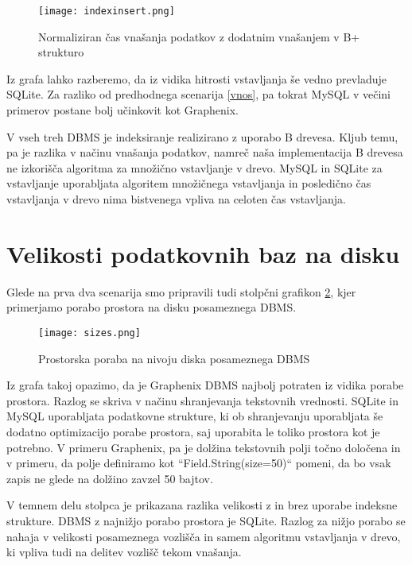 \documentclass[a4paper,12pt,openright]{book}
\begin{document}
    \begin{figure}[H]
        \centerline{\texttt{[image: indexinsert.png]}}
        \caption{Normaliziran čas vnašanja podatkov z dodatnim vnašanjem v B+ strukturo}
        \label{index_vnos}
    \end{figure}

    \noindent
    Iz grafa lahko razberemo, da iz vidika hitrosti vstavljanja še vedno prevladuje SQLite. Za razliko od predhodnega scenarija \ref{vnos}, pa tokrat MySQL v večini primerov postane bolj učinkovit kot Graphenix.

    V vseh treh DBMS je indeksiranje realizirano z uporabo B drevesa. Kljub temu, pa je razlika v načinu vnašanja podatkov, namreč naša implementacija B drevesa ne izkorišča algoritma za množično vstavljanje v drevo. MySQL in SQLite za vstavljanje uporabljata algoritem množičnega vstavljanja in posledično čas vstavljanja v drevo nima bistvenega vpliva na celoten čas vstavljanja.
 
    \section{Velikosti podatkovnih baz na disku}
    \label{size_analysis}

    Glede na prva dva scenarija smo pripravili tudi stolpčni grafikon \ref{velikosti}, kjer primerjamo porabo prostora na disku posameznega DBMS.
    
    \begin{figure}[H]
        \centerline{\texttt{[image: sizes.png]}}
        \caption{Prostorska poraba na nivoju diska posameznega DBMS}
        \label{velikosti}
    \end{figure}

    \noindent
    Iz grafa takoj opazimo, da je Graphenix DBMS najbolj potraten iz vidika porabe prostora. Razlog se skriva v načinu shranjevanja tekstovnih vrednosti. SQLite in MySQL uporabljata podatkovne strukture, ki ob shranjevanju uporabljata še dodatno optimizacijo porabe prostora, saj uporabita le toliko prostora kot je potrebno. V primeru Graphenix, pa je dolžina tekstovnih polji točno določena in v primeru, da polje definiramo kot ``Field.String(size=50)`` pomeni, da bo vsak zapis ne glede na dolžino zavzel 50 bajtov.

    V temnem delu stolpca je prikazana razlika velikosti z in brez uporabe indeksne strukture. DBMS z najnižjo porabo prostora je SQLite. Razlog za nižjo porabo se nahaja v velikosti posameznega vozlišča in samem algoritmu vstavljanja v drevo, ki vpliva tudi na delitev vozlišč tekom vnašanja.
\end{document}
